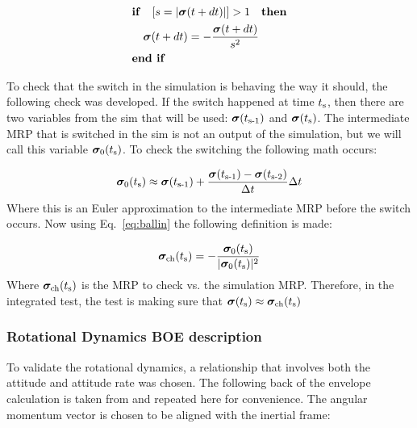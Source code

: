 \begin{equation}
\begin{gathered}
\begin{aligned}
&\textnormal{\textbf{if}}\quad [s = \vert \bm \sigma(t + dt) \vert ] > 1  \quad \textnormal{\textbf{then}}\\
&\quad \bm \sigma(t + dt) = - \frac{\bm \sigma(t + dt)}{s^2}\\
&\textnormal{\textbf{end if}}
\end{aligned}
\end{gathered}
\label{eq:ballin}
\end{equation}

To check that the switch in the simulation is behaving the way it should, the following check was developed. If the switch happened at time $t_\textnormal{s}$, then there are two variables from the sim that will be used: $\bm \sigma(t_\textnormal{s-1})$ and $\bm \sigma(t_\textnormal{s})$. The intermediate MRP that is switched in the sim is not an output of the simulation, but we will call this variable $\bm \sigma_0(t_\textnormal{s})$. To check the switching the following math occurs: 

\begin{equation}
\bm \sigma_0(t_\textnormal{s}) \approx \bm \sigma(t_\textnormal{s-1}) + \frac{\bm \sigma(t_\textnormal{s-1}) - \bm \sigma(t_\textnormal{s-2})}{\Delta t} \Delta t
\end{equation}
Where this is an Euler approximation to the intermediate MRP before the switch occurs. Now using Eq.~\eqref{eq:ballin} the following definition is made:

\begin{equation}
\bm \sigma_{\textnormal{ch}}(t_\textnormal{s}) = - \frac{\bm \sigma_0(t_\textnormal{s})}{\vert \bm \sigma_0(t_\textnormal{s}) \vert^2}
\end{equation}
Where $\bm \sigma_{\textnormal{ch}}(t_\textnormal{s})$ is the MRP to check vs. the simulation MRP. Therefore, in the integrated test, the test is making sure that $ \bm \sigma(t_\textnormal{s}) \approx \bm \sigma_{\textnormal{ch}}(t_\textnormal{s})$

\subsubsection{Rotational Dynamics BOE description}

To validate the rotational dynamics, a relationship that involves both the attitude and attitude rate was chosen. The following back of the envelope calculation is taken from\cite{schaub} and repeated here for convenience. The angular momentum vector is chosen to be aligned with the inertial frame:

